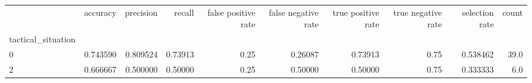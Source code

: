 \begin{tabular}{lrrrrrrrrr}
\toprule
{} &  accuracy &  precision &   recall &  false positive rate &  false negative rate &  true positive rate &  true negative rate &  selection rate &  count \\
tactical\_situation &           &            &          &                      &                      &                     &                     &                 &        \\
\midrule
0                  &  0.743590 &   0.809524 &  0.73913 &                 0.25 &              0.26087 &             0.73913 &                0.75 &        0.538462 &   39.0 \\
2                  &  0.666667 &   0.500000 &  0.50000 &                 0.25 &              0.50000 &             0.50000 &                0.75 &        0.333333 &    6.0 \\
\bottomrule
\end{tabular}
